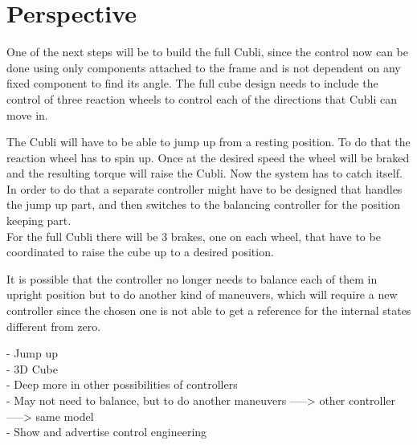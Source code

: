 \chapter{Perspective}

One of the next steps will be to build the full Cubli, since the control now can be done using only components attached to the frame and is not dependent on any fixed component to find its angle. The full cube design needs to include the control of three reaction wheels to control each of the directions that Cubli can move in. 

The Cubli will have to be able to jump up from a resting position. To do that the reaction wheel has to spin up. Once at the desired speed the wheel will be braked and the resulting torque will raise the Cubli. Now the system has to catch itself. In order to do that a separate controller might have to be designed that handles the jump up part, and then switches to the balancing controller for the position keeping part.\\
For the full Cubli there will be 3 brakes, one on each wheel, that have to be coordinated to raise the cube up to a desired position.

It is possible that the controller no longer needs to balance each of them in upright position but to do another kind of maneuvers, which will require a new controller since the chosen one is not able to get a reference for the internal states different from zero.


- Jump up\\
- 3D Cube\\
- Deep more in other possibilities of controllers\\
- May not need to balance, but to do another maneuvers -----> other controller -----> same model\\
- Show and advertise control engineering \\